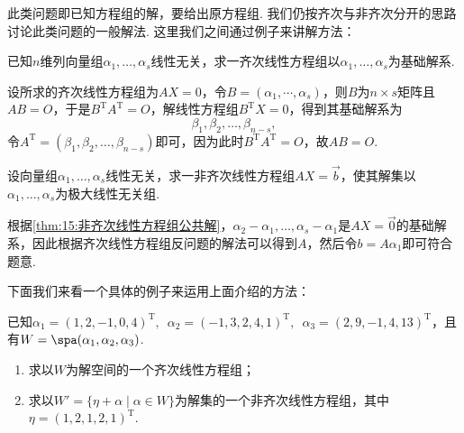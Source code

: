 此类问题即已知方程组的解，要给出原方程组. 我们仍按齐次与非齐次分开的思路讨论此类问题的一般解法. 这里我们之间通过例子来讲解方法：
\begin{example}
    已知$n$维列向量组$\alpha_1,\ldots,\alpha_s$线性无关，求一齐次线性方程组以$\alpha_1,\ldots,\alpha_s$为基础解系.
\end{example}

\begin{solution}
    设所求的齐次线性方程组为$AX=0$，令$B=(\alpha_1,\cdots,\alpha_s)$，则$B$为$n\times s$矩阵且$AB=O$，于是$B^\mathrm{T}A^\mathrm{T}=O$，解线性方程组$B^\mathrm{T}X=0$，得到其基础解系为
    \[\beta_1,\beta_2,\ldots,\beta_{n-s},\]
    令$A^\mathrm{T}=(\beta_1,\beta_2,\ldots,\beta_{n-s})$即可，因为此时$B^\mathrm{T}A^\mathrm{T}=O$，故$AB=O$.
\end{solution}

\begin{example}
    设向量组$\alpha_1,\ldots,\alpha_s$线性无关，求一非齐次线性方程组$AX=\vec{b}$，使其解集以$\alpha_1,\ldots,\alpha_s$为极大线性无关组.
\end{example}

\begin{solution}
    根据\autoref{thm:15:非齐次线性方程组公共解}，$\alpha_2-\alpha_1,\ldots,\alpha_s-\alpha_1$是$AX=\vec{0}$的基础解系，因此根据齐次线性方程组反问题的解法可以得到$A$，然后令$b=A\alpha_1$即可符合题意.
\end{solution}

下面我们来看一个具体的例子来运用上面介绍的方法：
\begin{example}
    已知$\alpha_1=(1,2,-1,0,4)^\mathrm{T},\enspace\alpha_2=(-1,3,2,4,1)^\mathrm{T},\enspace\alpha_3=(2,9,-1,4,13)^\mathrm{T}$，且有$W=\spa(\alpha_1,\alpha_2,\alpha_3)$.
    \begin{enumerate}
        \item 求以$W$为解空间的一个齐次线性方程组；

        \item 求以$W'=\{\eta+\alpha \mid \alpha\in W\}$为解集的一个非齐次线性方程组，其中$\eta=(1,2,1,2,1)^\mathrm{T}$.
    \end{enumerate}
\end{example}

